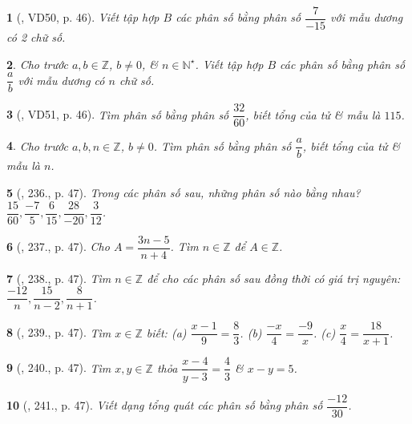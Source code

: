 \documentclass{article}
\newtheorem{baitoan}{}
\begin{document}
\begin{baitoan}[\cite{Tuyen_Toan_6}, VD50, p. 46]
	Viết tập hợp $B$ các phân số bằng phân số $\dfrac{7}{-15}$ với mẫu dương có 2 chữ số.
\end{baitoan}

\begin{baitoan}
	Cho trước $a,b\in\mathbb{Z}$, $b\ne0$, \& $n\in\mathbb{N}^\star$. Viết tập hợp $B$ các phân số bằng phân số $\dfrac{a}{b}$ với mẫu dương có $n$ chữ số.
\end{baitoan}

\begin{baitoan}[\cite{Tuyen_Toan_6}, VD51, p. 46]
	Tìm phân số bằng phân số $\dfrac{32}{60}$, biết tổng của tử \& mẫu là $115$.
\end{baitoan}

\begin{baitoan}
	Cho trước $a,b,n\in\mathbb{Z}$, $b\ne0$. Tìm phân số bằng phân số $\dfrac{a}{b}$, biết tổng của tử \& mẫu là $n$.
\end{baitoan}

\begin{baitoan}[\cite{Tuyen_Toan_6}, 236., p. 47]
	Trong các phân số sau, những phân số nào bằng nhau? $\dfrac{15}{60},\dfrac{-7}{5},\dfrac{6}{15},\dfrac{28}{-20},\dfrac{3}{12}$.
\end{baitoan}

\begin{baitoan}[\cite{Tuyen_Toan_6}, 237., p. 47]
	Cho $A = \dfrac{3n - 5}{n + 4}$. Tìm $n\in\mathbb{Z}$ để $A\in\mathbb{Z}$.
\end{baitoan}

\begin{baitoan}[\cite{Tuyen_Toan_6}, 238., p. 47]
	Tìm $n\in\mathbb{Z}$ để cho các phân số sau đồng thời có giá trị nguyên: $\dfrac{-12}{n},\dfrac{15}{n - 2},\dfrac{8}{n + 1}$.
\end{baitoan}

\begin{baitoan}[\cite{Tuyen_Toan_6}, 239., p. 47]
	Tìm $x\in\mathbb{Z}$ biết: (a) $\dfrac{x - 1}{9} = \dfrac{8}{3}$. (b) $\dfrac{-x}{4} = \dfrac{-9}{x}$. (c) $\dfrac{x}{4} = \dfrac{18}{x + 1}$.
\end{baitoan}

\begin{baitoan}[\cite{Tuyen_Toan_6}, 240., p. 47]
	Tìm $x,y\in\mathbb{Z}$ thỏa $\dfrac{x - 4}{y - 3} = \dfrac{4}{3}$ \& $x - y = 5$.
\end{baitoan}

\begin{baitoan}[\cite{Tuyen_Toan_6}, 241., p. 47]
	Viết dạng tổng quát các phân số bằng phân số $\dfrac{-12}{30}$.
\end{baitoan}
\end{document}
